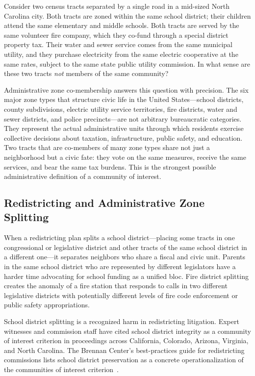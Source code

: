 Consider two census tracts separated by a single road in a mid-sized North Carolina city.
Both tracts are zoned within the same school district; their children attend the same
elementary and middle schools.
Both tracts are served by the same volunteer fire company, which they co-fund through
a special district property tax.
Their water and sewer service comes from the same municipal utility, and they purchase
electricity from the same electric cooperative at the same rates, subject to the same
state public utility commission.
In what sense are these two tracts \emph{not} members of the same community?

Administrative zone co-membership answers this question with precision.
The six major zone types that structure civic life in the United States---school
districts, county subdivisions, electric utility service territories, fire districts,
water and sewer districts, and police precincts---are not arbitrary bureaucratic
categories.
They represent the actual administrative units through which residents exercise
collective decisions about taxation, infrastructure, public safety, and education.
Two tracts that are co-members of many zone types share not just a neighborhood
but a civic fate: they vote on the same measures, receive the same services, and
bear the same tax burdens.
This is the strongest possible administrative definition of a community of interest.

\subsection{Redistricting and Administrative Zone Splitting}

When a redistricting plan splits a school district---placing some tracts in one
congressional or legislative district and other tracts of the same school district
in a different one---it separates neighbors who share a fiscal and civic unit.
Parents in the same school district who are represented by different legislators
have a harder time advocating for school funding as a unified bloc.
Fire district splitting creates the anomaly of a fire station that responds to
calls in two different legislative districts with potentially different levels of
fire code enforcement or public safety appropriations.

School district splitting is a recognized harm in redistricting litigation.
Expert witnesses and commission staff have cited school district integrity as a
community of interest criterion in proceedings across California, Colorado, Arizona,
Virginia, and North Carolina.
The Brennan Center's best-practices guide for redistricting commissions lists
school district preservation as a concrete operationalization of the communities
of interest criterion~\citep{levitt2011guide}.

